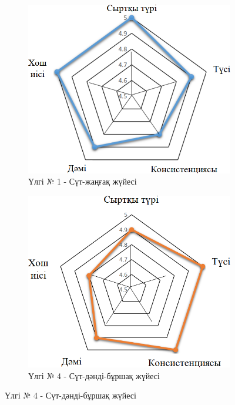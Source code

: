 \begin{figure}[H]
    \centering
    \begin{subfigure}[b]{0.4\textwidth}
        \centering
        \includegraphics[width=\textwidth]{media/pish2/image6}
        \caption*{Үлгі № 1 - Сүт-жаңғақ жүйесі}
    \end{subfigure}
    \hspace{0.5cm}
    \begin{subfigure}[b]{0.4\textwidth}
        \centering
        \includegraphics[width=\textwidth]{media/pish2/image7}
        \caption*{Үлгі № 4 - Сүт-дәнді-бұршақ жүйесі}
    \end{subfigure}
\end{figure}

